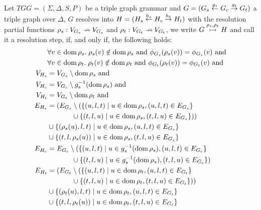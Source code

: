 \documentclass[]{report}
\begin{document}
\begin{definition}
	Let $TGG = (\Sigma, \Delta, S, P)$ be a triple graph grammar and $G = (G_s \overset{g_s}{\leftarrow} G_c \overset{g_t}{\rightarrow} G_t)$ a triple graph over $\Delta$, $G$ resolves into $H = (H_s \overset{h_s}{\leftarrow} H_c \overset{h_t}{\rightarrow} H_t)$ with the resolution partial functions $\rho_s: V_{G_s} \nrightarrow V_{G_s}$ and $\rho_t: V_{G_t} \nrightarrow V_{G_t}$, we write $G \overset{\rho_s, \rho_t}{\rightarrowtail} H$ and call it a resolution step, if, and only if, the following holds:
	\begin{align*}
	& \forall v \in \operatorname{dom} \rho_s . \; \rho_s(v) \notin \operatorname{dom} \rho_s \text{ and } \phi_{G_s}(\rho_s(v)) = \phi_{G_s}(v) \text{ and}\\
	& \forall v \in \operatorname{dom} \rho_t . \; \rho_t(v) \notin \operatorname{dom} \rho_t \text{ and } \phi_{G_t}(\rho_t(v)) = \phi_{G_t}(v) \text{ and}\\
	V_{H_s} & = V_{G_s} \setminus \operatorname{dom}  \rho_s\text{ and}\\
	V_{H_c} & = V_{G_c} \setminus g_s^{-1}(\operatorname{dom}  \rho_s) \text{ and}\\
	V_{H_t} & = V_{G_t} \setminus \operatorname{dom}  \rho_t\text{ and}\\
	E_{H_s} & = (E_{G_s} \setminus (\{(u,l,t) \; | \; u \in \operatorname{dom} \rho_s, (u,l,t) \in E_{G_s}\} \\
			&\hspace{3.5em} \cup \{(t,l,u) \; | \; u \in \operatorname{dom} \rho_s, (t,l,u) \in E_{G_s}\}))\\
	& \cup \{(\rho_s(u),l,t) \; | \; u \in \operatorname{dom} \rho_s, (u,l,t) \in E_{G_s}\} \\
	& \cup \{(t,l,\rho_s(u)) \; | \; u \in \operatorname{dom} \rho_s, (t,l,u) \in E_{G_s}\} \\
	E_{H_c} & = E_{G_c} \setminus (\{(u,l,t) \; | \; u \in g_s^{-1}(\operatorname{dom} \rho_s), (u,l,t) \in E_{G_c}\} \\
			&\hspace{3.5em} \cup \{(t,l,u) \; | \; u \in g_s^{-1}(\operatorname{dom} \rho_s), (t,l,u) \in E_{G_c}\})\\
	E_{H_t} & = (E_{G_t} \setminus (\{(u,l,t) \; | \; u \in \operatorname{dom} \rho_t, (u,l,t) \in E_{G_t}\} \\
	&\hspace{3.5em} \cup \{(t,l,u) \; | \; u \in \operatorname{dom} \rho_t, (t,l,u) \in E_{G_t}\}))\\
	& \cup \{(\rho_t(u),l,t) \; | \; u \in \operatorname{dom} \rho_t, (u,l,t) \in E_{G_t}\} \\
	& \cup \{(t,l,\rho_t(u)) \; | \; u \in \operatorname{dom} \rho_t, (t,l,u) \in E_{G_t}\}
	\end{align*}
\end{definition}
\end{document}
